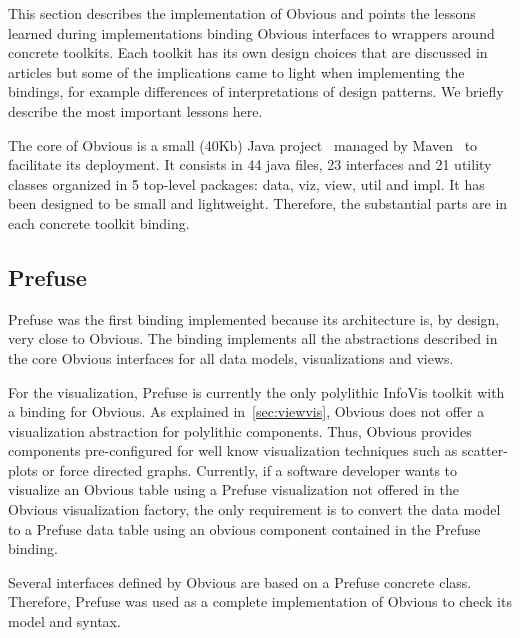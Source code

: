 
This section describes the implementation of Obvious and points the
lessons learned during implementations binding Obvious interfaces to
wrappers around concrete toolkits.  Each toolkit has its own design
choices that are discussed in articles but some of the implications
came to light when implementing the bindings, for example differences
of interpretations of design patterns.  We briefly describe the most
important lessons here.

The core of Obvious is a small (40Kb) Java
project~\cite{Obvious} managed by
Maven~\cite{Maven} to facilitate its deployment.  It consists in 44
java files, 23 interfaces and 21 utility classes organized in 5
top-level packages: data, viz, view, util and impl.  It has been
designed to be small and lightweight.  Therefore, the substantial
parts are in each concrete toolkit binding.


\subsection{Prefuse}

Prefuse was the first binding implemented because its architecture is,
by design, very close to Obvious.  The binding implements all the
abstractions described in the core Obvious interfaces for all data
models, visualizations and views.

For the visualization, Prefuse is currently the only polylithic
InfoVis toolkit with a binding for Obvious.  As
explained in~\ref{sec:viewvis}, Obvious does not offer a visualization
abstraction for polylithic components.  Thus, Obvious provides
components pre-configured for well know visualization techniques such
as scatter-plots or force directed graphs.  Currently, if a software
developer wants to visualize an Obvious table using a Prefuse
visualization not offered in the Obvious visualization factory, the
only requirement is to convert the data model to a Prefuse data table
using an obvious component contained in the Prefuse binding.  


Several interfaces defined by Obvious are based on a Prefuse concrete
class.  Therefore, Prefuse was used as a complete implementation of
Obvious to check its model and syntax.

